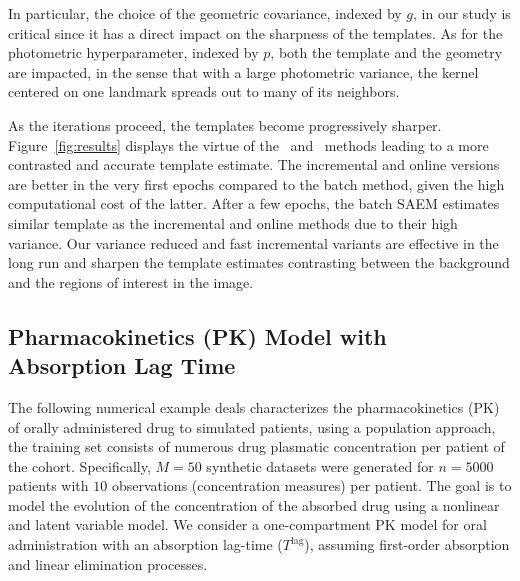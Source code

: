 \documentclass[12pt]{article}
\begin{document}
In particular, the choice of the geometric covariance, indexed by $g$, in our study is critical since it has a direct impact on the {sharpness} of the templates.
As for the photometric hyperparameter, indexed by $p$, both the template and the geometry are impacted, in the sense that with a large photometric variance, the kernel centered on one landmark {spreads out} to many of its neighbors.


As the iterations proceed, the templates become progressively sharper.
Figure~\ref{fig:results} displays the virtue of the \SAEMVR\ and \FISAEM\ methods leading to a more {contrasted} and {accurate} template estimate. 
The incremental and online versions are better in the very first epochs compared to the batch method, given the high computational cost of the latter. 
After a few epochs, the batch SAEM estimates similar template as the incremental and online methods due to their high variance. 
Our variance reduced and fast incremental variants are effective in the long run and sharpen the template estimates contrasting between the background and the regions of interest in the image.

\subsection{Pharmacokinetics (PK) Model with Absorption Lag Time}
The following numerical example deals characterizes the pharmacokinetics (PK) of orally administered drug to simulated patients, using a population approach, \ie the training set consists of numerous drug plasmatic concentration per patient of the cohort. 
Specifically, $M = 50$ synthetic datasets were generated for $n = 5000$ patients with $10$ observations (concentration measures) per patient.
The goal is to model the evolution of the concentration of the absorbed drug using a {nonlinear} and {latent} variable model. 
We consider a one-compartment PK model for oral administration with an absorption lag-time ($T^{\textrm{lag}}$), assuming first-order absorption and linear elimination processes.
\end{document}
